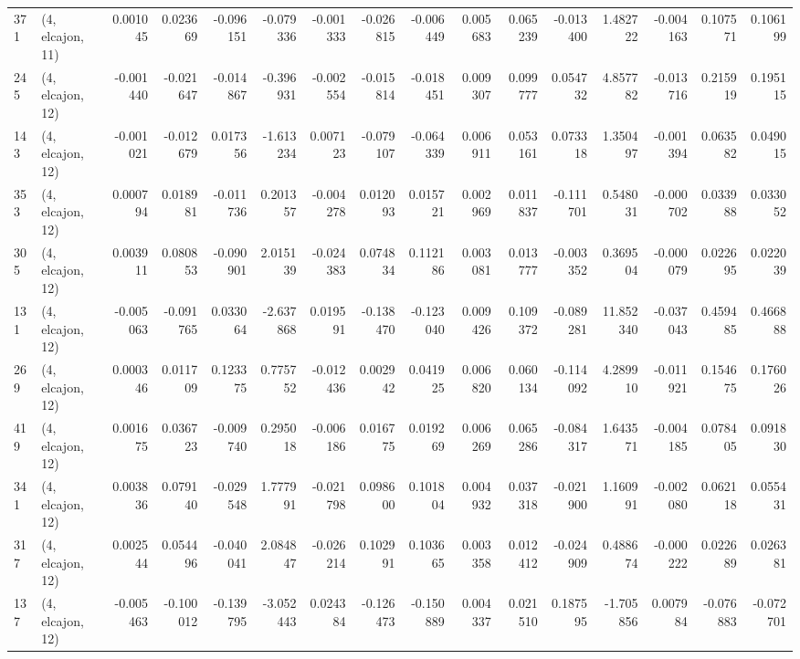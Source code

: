 \begin{tabular}{llrrrrrrrrrrrrrr}
371 &  (4, elcajon, 11) &   0.001045 &  0.023669 & -0.096151 &   -0.079336 & -0.001333 &  -0.026815 & -0.006449 &  0.005683 &  0.065239 & -0.013400 &    1.482722 & -0.004163 &  0.107571 &  0.106199 \\
245 &  (4, elcajon, 12) &  -0.001440 & -0.021647 & -0.014867 &   -0.396931 & -0.002554 &  -0.015814 & -0.018451 &  0.009307 &  0.099777 &  0.054732 &    4.857782 & -0.013716 &  0.215919 &  0.195115 \\
143 &  (4, elcajon, 12) &  -0.001021 & -0.012679 &  0.017356 &   -1.613234 &  0.007123 &  -0.079107 & -0.064339 &  0.006911 &  0.053161 &  0.073318 &    1.350497 & -0.001394 &  0.063582 &  0.049015 \\
353 &  (4, elcajon, 12) &   0.000794 &  0.018981 & -0.011736 &    0.201357 & -0.004278 &   0.012093 &  0.015721 &  0.002969 &  0.011837 & -0.111701 &    0.548031 & -0.000702 &  0.033988 &  0.033052 \\
305 &  (4, elcajon, 12) &   0.003911 &  0.080853 & -0.090901 &    2.015139 & -0.024383 &   0.074834 &  0.112186 &  0.003081 &  0.013777 & -0.003352 &    0.369504 & -0.000079 &  0.022695 &  0.022039 \\
131 &  (4, elcajon, 12) &  -0.005063 & -0.091765 &  0.033064 &   -2.637868 &  0.019591 &  -0.138470 & -0.123040 &  0.009426 &  0.109372 & -0.089281 &   11.852340 & -0.037043 &  0.459485 &  0.466888 \\
269 &  (4, elcajon, 12) &   0.000346 &  0.011709 &  0.123375 &    0.775752 & -0.012436 &   0.002942 &  0.041925 &  0.006820 &  0.060134 & -0.114092 &    4.289910 & -0.011921 &  0.154675 &  0.176026 \\
419 &  (4, elcajon, 12) &   0.001675 &  0.036723 & -0.009740 &    0.295018 & -0.006186 &   0.016775 &  0.019269 &  0.006269 &  0.065286 & -0.084317 &    1.643571 & -0.004185 &  0.078405 &  0.091830 \\
341 &  (4, elcajon, 12) &   0.003836 &  0.079140 & -0.029548 &    1.777991 & -0.021798 &   0.098600 &  0.101804 &  0.004932 &  0.037318 & -0.021900 &    1.160991 & -0.002080 &  0.062118 &  0.055431 \\
317 &  (4, elcajon, 12) &   0.002544 &  0.054496 & -0.040041 &    2.084847 & -0.026214 &   0.102991 &  0.103665 &  0.003358 &  0.012412 & -0.024909 &    0.488674 & -0.000222 &  0.022689 &  0.026381 \\
137 &  (4, elcajon, 12) &  -0.005463 & -0.100012 & -0.139795 &   -3.052443 &  0.024384 &  -0.126473 & -0.150889 &  0.004337 &  0.021510 &  0.187595 &   -1.705856 &  0.007984 & -0.076883 & -0.072701 \\

\end{tabular}
